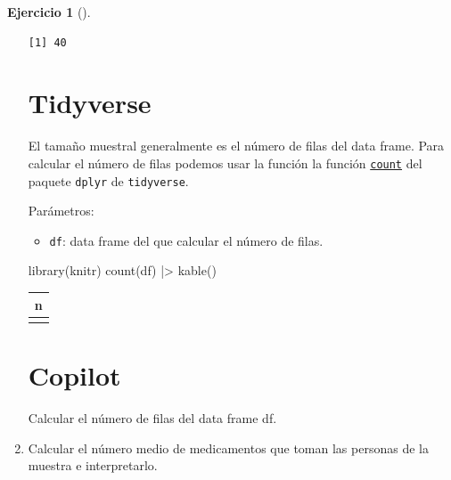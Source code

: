 \documentclass[
  a4paper,
]{scrreport}
\newenvironment{Shaded}{\begin{snugshade}}{\end{snugshade}}
\newcommand{\ExtensionTok}[1]{\textcolor[rgb]{0.00,0.23,0.31}{#1}}
\newcommand{\FunctionTok}[1]{\textcolor[rgb]{0.28,0.35,0.67}{#1}}
\newcommand{\NormalTok}[1]{\textcolor[rgb]{0.00,0.23,0.31}{#1}}
\newcommand{\SpecialCharTok}[1]{\textcolor[rgb]{0.37,0.37,0.37}{#1}}
\providecommand{\tightlist}{%
  \setlength{\itemsep}{0pt}\setlength{\parskip}{0pt}}\usepackage{longtable,booktabs,array}
\theoremstyle{definition}
\newtheorem{exercise}{Ejercicio}[chapter]
\theoremstyle{remark}
\begin{document}
\begin{exercise}[]
\begin{enumerate}
\begin{tcolorbox}
\begin{verbatim}
[1] 40
\end{verbatim}

  \section{Tidyverse}

  El tamaño muestral generalmente es el número de filas del data frame.
  Para calcular el número de filas podemos usar la función la función
  \href{https://dplyr.tidyverse.org/reference/count.html}{\texttt{count}}
  del paquete \texttt{dplyr} de \texttt{tidyverse}.

  Parámetros:

  \begin{itemize}
  \tightlist
  \item
    \texttt{df}: data frame del que calcular el número de filas.
  \end{itemize}

\begin{Shaded}
\begin{Highlighting}[]
\FunctionTok{library}\NormalTok{(knitr)}
\FunctionTok{count}\NormalTok{(df) }\SpecialCharTok{|\textgreater{}} \FunctionTok{kable}\NormalTok{()}
\end{Highlighting}
\end{Shaded}

  \begin{longtable}[]{@{}r@{}}
  \toprule\noalign{}
  n \\
  \midrule\noalign{}
  \endhead
  \bottomrule\noalign{}
  \endlastfoot
  40 \\
  \end{longtable}

  \section{Copilot}

\begin{Shaded}
\begin{Highlighting}[]
\ExtensionTok{Calcular}\NormalTok{ el número de filas del data frame df.}
\end{Highlighting}
\end{Shaded}

  \end{tcolorbox}
\item
  Calcular el número medio de medicamentos que toman las personas de la
  muestra e interpretarlo.


\end{enumerate}
\end{exercise}
\end{document}
